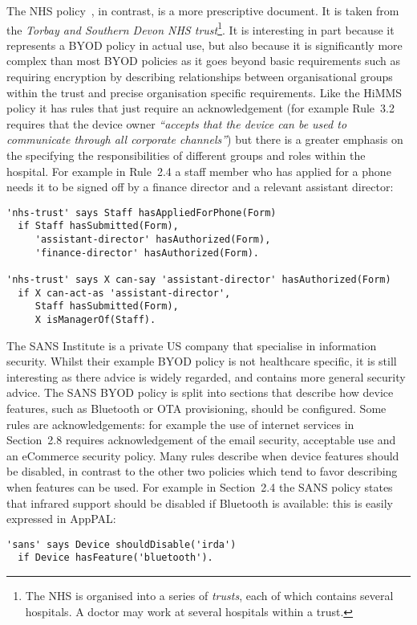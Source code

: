 \documentclass[a4paper]{article}
\begin{document}
The NHS policy~\cite{kennington_mobiles_2014}, in contrast, is a more prescriptive document.
It is taken from the \emph{Torbay and Southern Devon NHS trust}\footnote{The NHS is organised into a series of \emph{trusts}, each of which contains several hospitals.  A doctor may work at several hospitals within a trust.}. 
It is interesting in part because it represents a \ac{BYOD} policy in actual use, but also because it is significantly more complex than most \ac{BYOD} policies as it goes beyond basic requirements such as requiring encryption by describing relationships between organisational groups within the trust and precise organisation specific requirements.
Like the \ac{HiMMS} policy it has rules that just require an acknowledgement (for example Rule~3.2 requires that the device owner \emph{``accepts that the device can be used to communicate through all corporate channels''}) but there is a greater emphasis on the specifying the responsibilities of different groups and roles within the hospital.  For example in Rule~2.4 a staff member who has applied for a phone needs it to be signed off by a finance director and a relevant assistant director:
\begin{lstlisting}[title={\footnotesize\textbf{\ac{NHS}}:~\itshape 
Upon receipt of the completed application form, allocation will also need to be authorised by the relevant Assistant Director and the Director of Finance.}]
'nhs-trust' says Staff hasAppliedForPhone(Form)
  if Staff hasSubmitted(Form),
     'assistant-director' hasAuthorized(Form),
     'finance-director' hasAuthorized(Form).

'nhs-trust' says X can-say 'assistant-director' hasAuthorized(Form)
  if X can-act-as 'assistant-director',
     Staff hasSubmitted(Form),
     X isManagerOf(Staff).
\end{lstlisting}

The SANS Institute is a private US company that specialise in information security.
Whilst their example \ac{BYOD} policy is not healthcare specific, it is still interesting as there advice is widely regarded, and contains more general security advice.
The SANS \ac{BYOD} policy is split into sections that describe how device features, such as Bluetooth or OTA provisioning, should be configured.  Some rules are acknowledgements: for example the use of internet services in Section~2.8 requires acknowledgement of the email security, acceptable use and an eCommerce security policy.
Many rules describe when device features should be disabled, in contrast to the other two policies which tend to favor describing when features can be used.
For example in Section~2.4 the SANS policy states that infrared support should be disabled if Bluetooth is available: this is easily expressed in AppPAL:
\begin{lstlisting}[title={\footnotesize\textbf{\ac{SANS}}:~\itshape 
Infrared supported MUST be disabled if Bluetooth connectivity is supported.}]
'sans' says Device shouldDisable('irda')
  if Device hasFeature('bluetooth').
\end{lstlisting}
\end{document}
